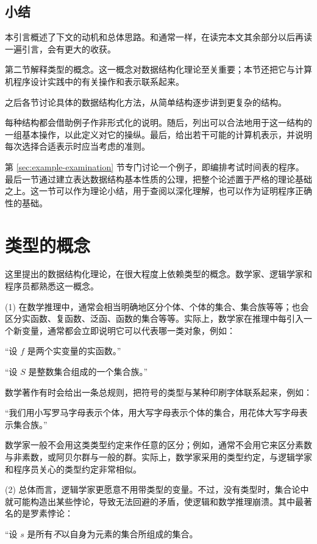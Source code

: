 \subsection{小结}

本引言概述了下文的动机和总体思路。和通常一样，在读完本文其余部分以后再读一遍引言，会有更大的收获。

第二节解释类型的概念。这一概念对数据结构化理论至关重要；本节还把它与计算机程序设计实践中的有关操作和表示联系起来。

之后各节讨论具体的数据结构化方法，从简单结构逐步讲到更复杂的结构。

每种结构都会借助例子作非形式化的说明。随后，列出可以合法地用于这一结构的一组基本操作，以此定义对它的操纵。最后，给出若干可能的计算机表示，并说明每次选择合适表示时应当考虑的准则。

第 \ref{sec:example-examination} 节专门讨论一个例子，即编排考试时间表的程序。最后一节通过建立表达数据结构基本性质的公理，把整个论述置于严格的理论基础之上。这一节可以作为理论小结，用于查阅以深化理解，也可以作为证明程序正确性的基础。
\section[类型的概念]{类型的概念}

这里提出的数据结构化理论，在很大程度上依赖类型的概念。数学家、逻辑学家和程序员都熟悉这一概念。

(1) 在数学推理中，通常会相当明确地区分个体、个体的集合、集合族等等；也会区分实函数、复函数、泛函、函数的集合等等。实际上，数学家在推理中每引入一个新变量，通常都会立即说明它可以代表哪一类对象，例如：

\quad “设 $f$ 是两个实变量的实函数。”

\quad “设 $S$ 是整数集合组成的一个集合族。”

数学著作有时会给出一条总规则，把符号的类型与某种印刷字体联系起来，例如：

\parindent \quad“我们用小写罗马字母表示个体，用大写字母表示个体的集合，用花体大写字母表示集合族。”

数学家一般不会用这类类型约定来作任意的区分；例如，通常不会用它来区分素数与非素数，或阿贝尔群与一般的群。实际上，数学家采用的类型约定，与逻辑学家和程序员关心的类型约定非常相似。

(2) 总体而言，逻辑学家更愿意不用带类型的变量。不过，没有类型时，集合论中就可能构造出某些悖论，导致无法回避的矛盾，使逻辑和数学推理崩溃。其中最著名的是罗素悖论：

\quad \hspace{-.4em}“设 $s$ 是所有\textit{不}以自身为元素的集合所组成的集合。


